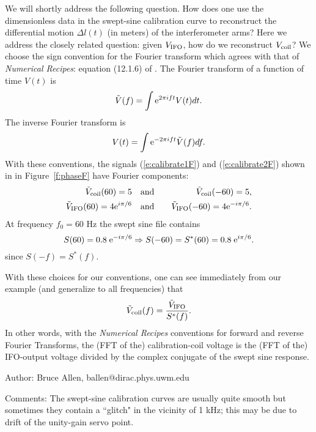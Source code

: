 We will shortly address the following question.  How does one use the
dimensionless data in the swept-sine calibration curve to reconstruct the
differential motion $\Delta l(t)$ (in meters) of the interferometer
arms?  Here we address the closely related question:  given $V_{\rm
IFO}$, how do we reconstruct $V_{\rm coil}$?  We choose the sign
convention for the Fourier transform which agrees with that of {\it
Numerical Recipes}:  equation (12.1.6) of \cite{NumRec}.  The Fourier
transform of a function of time $V(t)$ is
\begin{equation}
\label{e:fft1F}
{\tilde V}(f) = \int {\rm e}^{2 \pi i f t} V(t) dt.
\end{equation}
The inverse Fourier transform is
\begin{equation}
\label{e:fft2F}
V(t)= \int {\rm e}^{-2 \pi i f t} {\tilde V}(f) df.
\end{equation}
With these conventions, the signals (\ref{e:calibrate1F}) and
(\ref{e:calibrate2F}) shown in in Figure~\ref{f:phaseF} have Fourier
components:
\begin{eqnarray}
{\tilde V}_{\rm coil}(60) = 5                  \quad &{\rm and}& \quad {\tilde V}_{\rm coil}(-60) = 5,\\
{\tilde V}_{\rm IFO}(60)  = 4{\rm e}^{i \pi/6} \quad &{\rm and}& \quad {\tilde V}_{\rm IFO}(-60)  = 4 {\rm e}^{-i \pi/6}.
\end{eqnarray}
At frequency $f_0=60$ Hz the swept sine file
contains
\begin{equation}
S(60) = 0.8 \; {\rm e}^{-i \pi/6} \Rightarrow S(-60) = S^*(60) =
0.8 \; {\rm e}^{i \pi/6}.
\end{equation}
since $S(-f) = S^*(f)$.

With these choices for our conventions, one can see immediately from our
example (and generalize to all frequencies) that
\begin{equation}
\label{e:coilconF}
{\tilde V}_{\rm coil}(f) = {{\tilde V}_{\rm IFO} \over S^*(f)}.
\end{equation}
In other words, with the {\it Numerical Recipes} \cite{NumRec}
conventions for forward and reverse Fourier Transforms, the (FFT of
the) calibration-coil voltage is  the (FFT of the) IFO-output
voltage divided by the complex conjugate of the swept sine response.
\begin{description}
\item{Author:}  Bruce Allen, ballen@dirac.phys.uwm.edu
\item{Comments:}  The swept-sine calibration curves are usually quite
smooth but sometimes they contain a ``glitch" in the vicinity of
1 kHz; this may be due to drift of the unity-gain servo point.
\end{description}
\clearpage

